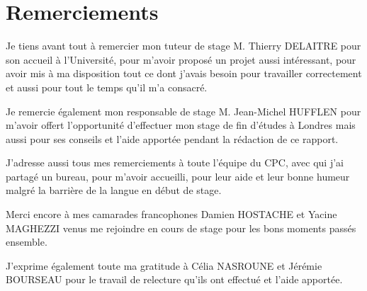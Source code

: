 \chapter*{Remerciements}

Je tiens avant tout \`a remercier mon tuteur de stage M. Thierry DELAITRE pour son accueil \`a l'Universit\'e, pour m'avoir propos\'e un projet aussi int\'eressant, pour avoir mis \`a ma disposition tout ce dont j'avais besoin pour travailler correctement et aussi pour tout le temps qu'il m'a consacr\'e.

Je remercie \'egalement mon responsable de stage M. Jean-Michel HUFFLEN pour m'avoir offert l'opportunit\'e d'effectuer mon stage de fin d'\'etudes \`a Londres mais aussi pour ses conseils et l'aide apport\'ee pendant la r\'edaction de ce rapport.

J'adresse aussi tous mes remerciements \`a toute l'\'equipe du CPC, avec qui j'ai partag\'e un bureau, pour m'avoir accueilli, pour leur aide et leur bonne humeur malgr\'e la barri\`ere de la langue en d\'ebut de stage.

Merci encore \`a mes camarades francophones Damien HOSTACHE et Yacine MAGHEZZI venus me rejoindre en cours de stage pour les bons moments pass\'es ensemble.

J'exprime \'egalement toute ma gratitude \`a C\'elia NASROUNE et J\'er\'emie BOURSEAU pour le travail de relecture qu'ils ont effectu\'e et l'aide apport\'ee.

\clearpage
